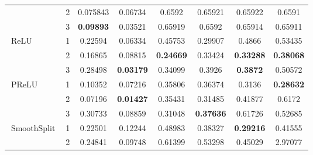 \documentclass{esannV2}
\DeclareMathOperator{\relu}{\mathrm{ReLU}}
\DeclareMathOperator{\smoothsplit}{\mathrm{SmoothSplit}}
\DeclareMathOperator{\prelu}{\mathrm{PReLU}}
\begin{document}
\begin{table}[ht]
\begin{tabular}{|l|c|cc|cccc|}
                       & 2                          & 0.075843                                    & 0.06734                                     & 0.6592           & 0.65921          & 0.65922          & 0.6591           \\
                       & 3                          & \textbf{0.09893}                            & 0.03521                                     & 0.65919          & 0.6592           & 0.65914          & 0.65911          \\
    \hline
    $\relu$            & 1                          & 0.22594                                     & 0.06334                                     & 0.45753          & 0.29907          & 0.4866           & 0.53435          \\
                       & 2                          & 0.16865                                     & 0.08815                                     & \textbf{0.24669} & 0.33424          & \textbf{0.33288} & \textbf{0.38068} \\
                       & 3                          & 0.28498                                     & \textbf{0.03179}                            & 0.34099          & 0.3926           & \textbf{0.3872}  & 0.50572          \\
    \hline
    $\prelu$           & 1                          & 0.10352                                     & 0.07216                                     & 0.35806          & 0.36374          & 0.3136           & \textbf{0.28632} \\
                       & 2                          & 0.07196                                     & \textbf{0.01427}                            & 0.35431          & 0.31485          & 0.41877          & 0.6172           \\
                       & 3                          & 0.30733                                     & 0.08859                                     & 0.31048          & \textbf{0.37636} & 0.61726          & 0.52685          \\
    \hline
    $\smoothsplit$     & 1                          & 0.22501                                     & 0.12244                                     & 0.48983          & 0.38327          & \textbf{0.29216} & 0.41555          \\
                       & 2                          & 0.24841                                     & 0.09748                                     & 0.61399          & 0.53298          & 0.45029          & 2.97077          \\

\end{tabular}
\end{table}
\end{document}
